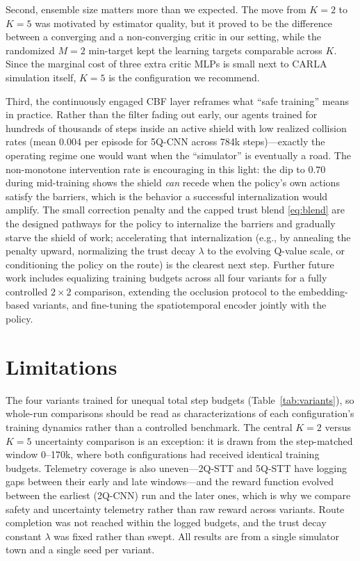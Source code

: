 \documentclass[conference]{IEEEtran}
\begin{document}
Second, ensemble size matters more than we expected. The move from $K{=}2$ to $K{=}5$ was motivated by estimator quality, but it proved to be the difference between a converging and a non-converging critic in our setting, while the randomized $M{=}2$ min-target kept the learning targets comparable across $K$. Since the marginal cost of three extra critic MLPs is small next to CARLA simulation itself, $K{=}5$ is the configuration we recommend.

Third, the continuously engaged CBF layer reframes what ``safe training'' means in practice. Rather than the filter fading out early, our agents trained for hundreds of thousands of steps inside an active shield with low realized collision rates (mean $0.004$ per episode for 5Q-CNN across 784k steps)---exactly the operating regime one would want when the ``simulator'' is eventually a road. The non-monotone intervention rate is encouraging in this light: the dip to $0.70$ during mid-training shows the shield \emph{can} recede when the policy's own actions satisfy the barriers, which is the behavior a successful internalization would amplify. The small correction penalty and the capped trust blend \eqref{eq:blend} are the designed pathways for the policy to internalize the barriers and gradually starve the shield of work; accelerating that internalization (e.g., by annealing the penalty upward, normalizing the trust decay $\lambda$ to the evolving Q-value scale, or conditioning the policy on the route) is the clearest next step. Further future work includes equalizing training budgets across all four variants for a fully controlled $2{\times}2$ comparison, extending the occlusion protocol to the embedding-based variants, and fine-tuning the spatiotemporal encoder jointly with the policy.

\section{Limitations}
The four variants trained for unequal total step budgets (Table~\ref{tab:variants}), so whole-run comparisons should be read as characterizations of each configuration's training dynamics rather than a controlled benchmark. The central $K{=}2$ versus $K{=}5$ uncertainty comparison is an exception: it is drawn from the step-matched window 0--170k, where both configurations had received identical training budgets. Telemetry coverage is also uneven---2Q-STT and 5Q-STT have logging gaps between their early and late windows---and the reward function evolved between the earliest (2Q-CNN) run and the later ones, which is why we compare safety and uncertainty telemetry rather than raw reward across variants. Route completion was not reached within the logged budgets, and the trust decay constant $\lambda$ was fixed rather than swept. All results are from a single simulator town and a single seed per variant.
\end{document}
